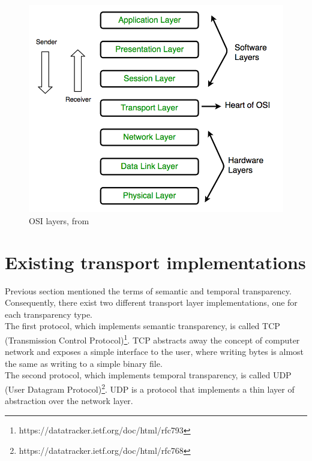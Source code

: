 \documentclass[times, utf8, diplomski]{fer}
\begin{document}
\begin{figure}[h!]
	\centering
	\includegraphics[scale=0.32]{OSI-model-layers}
	\caption{OSI layers, from \cite{GeeksForGeeks:OSI-model}}
\end{figure}


\section{Existing transport implementations}
Previous section mentioned the terms of semantic and temporal transparency. Consequently, there exist two different transport layer implementations, one for each transparency type. \\

The first protocol, which implements semantic transparency, is called TCP (Transmission Control Protocol)\footnote{https://datatracker.ietf.org/doc/html/rfc793}. TCP abstracts away the concept of computer network and exposes a simple interface to the user, where writing bytes is almost the same as writing to a simple binary file. \\

The second protocol, which implements temporal transparency, is called UDP (User Datagram Protocol)\footnote{https://datatracker.ietf.org/doc/html/rfc768}. UDP is a protocol that implements a thin layer of abstraction over the network layer.
\end{document}
